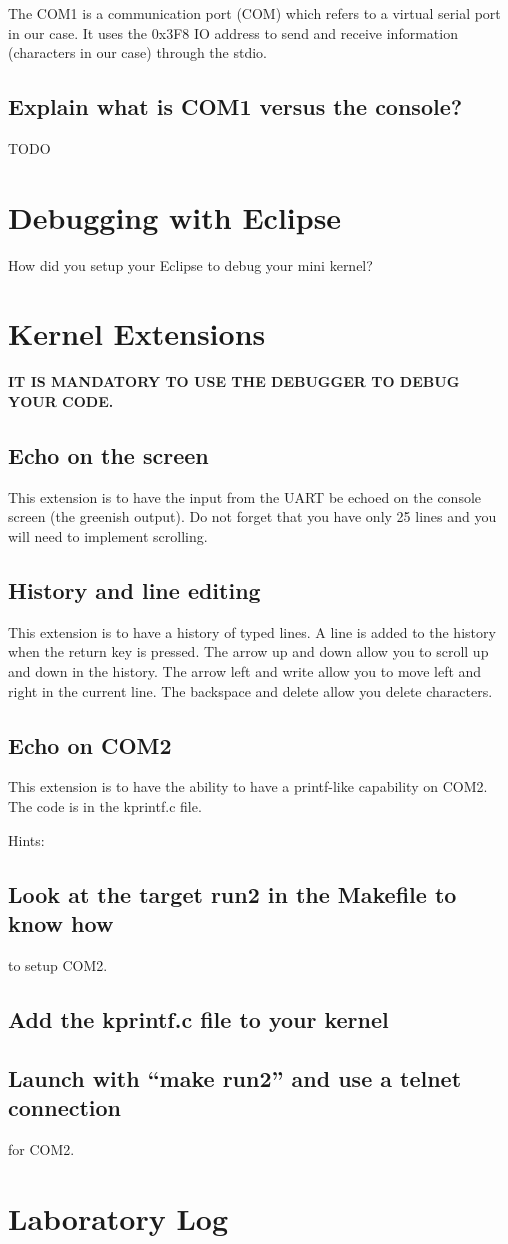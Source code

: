 \documentclass[10]{article}
\begin{document}
The COM1 is a communication port (COM) which refers to a virtual serial port in our case. It uses the 0x3F8 I\/O address to send and receive information (characters in our case) through the stdio.
\subsection{Explain what is COM1 versus the console?}

TODO

\section{Debugging with Eclipse}

How did you setup your Eclipse to debug your mini kernel?

\section{Kernel Extensions}

{\bf IT IS MANDATORY TO USE THE DEBUGGER TO DEBUG YOUR CODE.}

\subsection{Echo on the screen}

This extension is to have the input from the UART be
echoed on the console screen (the greenish output).
Do not forget that you have only 25 lines and you will
need to implement scrolling.

\subsection{History and line editing}

This extension is to have a history of typed lines.
A line is added to the history when the return key is pressed.
The arrow up and down allow you to scroll up and down in the history.
The arrow left and write allow you to move left and right in the current line.
The backspace and delete allow you delete characters.

\subsection{Echo on COM2}

This extension is to have the ability to have a printf-like
capability on COM2. The code is in the kprintf.c file.

\noindent Hints:
\subsection{Look at the target run2 in the Makefile to know how}
to setup COM2.
\subsection{Add the kprintf.c file to your kernel}
\subsection{Launch with ``make run2'' and use a telnet connection}
for COM2.


\section{Laboratory Log}
\end{document}
